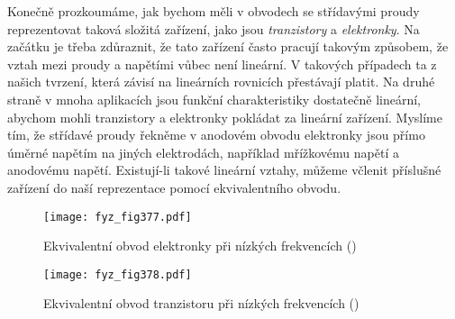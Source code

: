   Konečně prozkoumáme, jak bychom měli v obvodech se střídavými proudy reprezentovat taková složitá 
  zařízení, jako jsou \emph{tranzistory} a \emph{elektronky}. Na začátku je třeba zdůraznit, že 
  tato zařízení často pracují takovým způsobem, že vztah mezi proudy a napětími vůbec není 
  lineární. V takových případech ta z našich tvrzení, která závisí na lineárních rovnicích 
  přestávají platit. Na druhé straně v mnoha aplikacích jsou funkční charakteristiky dostatečně 
  lineární, abychom mohli tranzistory a elektronky pokládat za lineární zařízení. Myslíme tím, že 
  střídavé proudy řekněme v anodovém obvodu elektronky jsou přímo úměrné napětím na jiných 
  elektrodách, například mřížkovému napětí a anodovému napětí. Existují-li takové lineární vztahy, 
  můžeme včlenit příslušné zařízení do naší reprezentace pomocí ekvivalentního obvodu.

  \begin{figure}[ht!] %
    \centering
    \texttt{[image: fyz\_fig377.pdf]}
    \caption{Ekvivalentní obvod elektronky při nízkých frekvencích
             (\cite[s.~415]{Feynman02})}
    \label{fyz:fig377}
  \end{figure}

  \begin{figure}[ht!] %
    \centering
    \texttt{[image: fyz\_fig378.pdf]}
    \caption{Ekvivalentní obvod tranzistoru při nízkých frekvencích
             (\cite[s.~415]{Feynman02})}
    \label{fyz:fig378}
  \end{figure}
  
